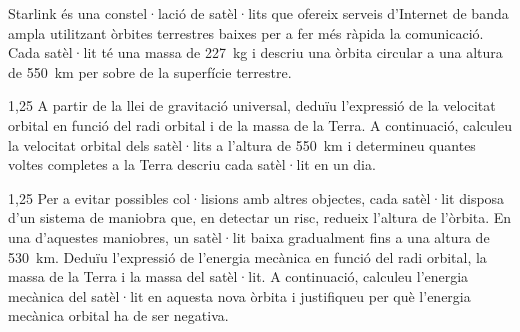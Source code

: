 Starlink és una constel·lació de satèl·lits que ofereix serveis d'Internet de banda ampla utilitzant òrbites terrestres baixes per a fer més ràpida la comunicació. Cada satèl·lit té una massa de 227~kg i descriu una òrbita circular a una altura de 550~km per sobre de la superfície terrestre.

\begin{apartat}{1,25}
A partir de la llei de gravitació universal, deduïu l'expressió de la velocitat orbital en funció del radi orbital i de la massa de la Terra. A continuació, calculeu la velocitat orbital dels satèl·lits a l'altura de 550~km i determineu quantes voltes completes a la Terra descriu cada satèl·lit en un dia.
\end{apartat}

\begin{apartat}{1,25}
Per a evitar possibles col·lisions amb altres objectes, cada satèl·lit disposa d'un sistema de maniobra que, en detectar un risc, redueix l'altura de l'òrbita. En una d'aquestes maniobres, un satèl·lit baixa gradualment fins a una altura de 530~km. Deduïu l'expressió de l'energia mecànica en funció del radi orbital, la massa de la Terra i la massa del satèl·lit. A continuació, calculeu l'energia mecànica del satèl·lit en aquesta nova òrbita i justifiqueu per què l'energia mecànica orbital ha de ser negativa.
\end{apartat}

